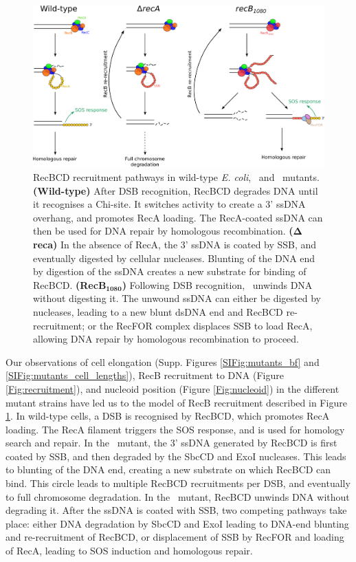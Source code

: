 \begin{figure}[htbp]
    \centering
    \includegraphics[width=\textwidth]{Figures/Fig_mutants_pathways.pdf}
    \caption{RecBCD recruitment pathways in wild-type \emph{E. coli}, \dreca\ and \geneteneighty\ mutants. \textbf{(Wild-type)} After DSB recognition, RecBCD degrades DNA until it recognises a Chi-site. It switches activity to create a 3' ssDNA overhang, and promotes RecA loading. The RecA-coated ssDNA can then be used for DNA repair by homologous recombination. \textbf{($\mathbf{\Delta}$reca)} In the absence of RecA, the 3' ssDNA is coated by SSB, and eventually digested by cellular nucleases. Blunting of the DNA end by digestion of the ssDNA creates a new substrate for binding of RecBCD. \textbf{(RecB$\mathbf{_{1080}}$)} Following DSB recognition, \teneighty\ unwinds DNA without digesting it. The unwound ssDNA can either be digested by nucleases, leading to a new blunt dsDNA end and RecBCD re-recruitment; or the RecFOR complex displaces SSB to load RecA, allowing DNA repair by homologous recombination to proceed.}
    \label{Fig:pathways}
\end{figure}

Our observations of cell elongation (Supp. Figures \ref{SIFig:mutants_bf} and \ref{SIFig:mutants_cell_lengths}), RecB recruitment to DNA (Figure \ref{Fig:recruitment}), and nucleoid position (Figure \ref{Fig:nucleoid}) in the different mutant strains have led us to the model of RecB recruitment described in Figure \ref{Fig:pathways}. In wild-type cells, a DSB is recognised by RecBCD, which promotes RecA loading. The RecA filament triggers the SOS response, and is used for homology search and repair. In the \dreca\ mutant, the 3' ssDNA generated by RecBCD is first coated by SSB, and then degraded by the SbcCD and ExoI nucleases\cite{Zahradka2009}. This leads to blunting of the DNA end, creating a new substrate on which RecBCD can bind. This circle leads to multiple RecBCD recruitments per DSB, and eventually to full chromosome degradation. In the \geneteneighty\ mutant, RecBCD unwinds DNA without degrading it. After the ssDNA is coated with SSB, two competing pathways take place: either DNA degradation by SbcCD and ExoI leading to DNA-end blunting and re-recruitment of RecBCD, or displacement of SSB by RecFOR and loading of RecA, leading to SOS induction and homologous repair.

